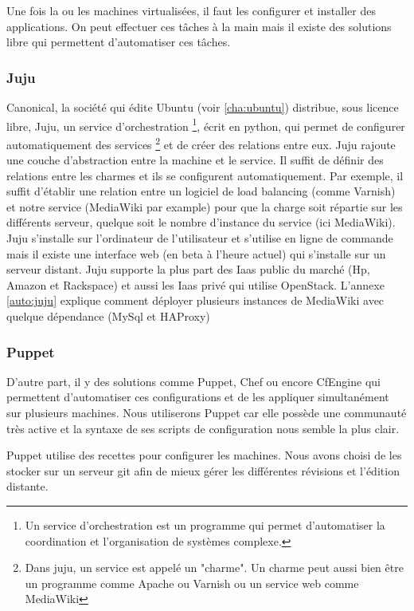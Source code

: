 \documentclass[a4paper,oneside]{report}
\begin{document}
Une fois la ou les machines virtualisées, il faut les configurer et installer des applications. On peut effectuer ces tâches à la main mais il existe des solutions libre qui permettent d'automatiser ces tâches.

\subsubsection{Juju}
Canonical, la société qui édite Ubuntu (voir \ref{cha:ubuntu}) distribue, sous licence libre, Juju, un service d'orchestration
\footnote{Un service d'orchestration est un programme qui permet d'automatiser la coordination et l'organisation de systèmes complexe.}, 
écrit en python, qui permet de configurer automatiquement des services
\footnote{Dans juju, un service est appelé un "charme". Un charme peut aussi bien être un programme comme Apache ou Varnish ou un service web comme MediaWiki} 
et de créer des relations entre eux. 
Juju rajoute une couche d'abstraction entre la machine et le service. Il suffit de définir des relations entre les charmes et ils se configurent automatiquement. 
Par exemple, il suffit d'établir une relation entre un logiciel de load balancing (comme Varnish) et notre service (MediaWiki par example) pour que la charge soit répartie sur les différents serveur, quelque soit le nombre d'instance du service (ici MediaWiki).
Juju s'installe sur l'ordinateur de l'utilisateur et s'utilise en ligne de commande mais il existe une interface web (en beta à l'heure actuel) qui s'installe sur un serveur distant.
Juju supporte la plus part des Iaas public du marché (Hp, Amazon et Rackspace) et aussi les Iaas privé qui utilise OpenStack.
L'annexe \ref{auto:juju} explique comment déployer plusieurs instances de MediaWiki avec quelque dépendance (MySql et HAProxy)

\subsubsection{Puppet}
D'autre part, il y des solutions comme Puppet, Chef ou encore CfEngine qui permettent d'automatiser ces configurations et de les appliquer simultanément sur plusieurs machines.
Nous utiliserons Puppet car elle possède une communauté très active et la syntaxe de ses scripts de configuration nous semble la plus clair.

Puppet utilise des recettes pour configurer les machines.
Nous avons choisi de les stocker sur un serveur git afin de mieux gérer les différentes révisions et l'édition distante.
\end{document}
